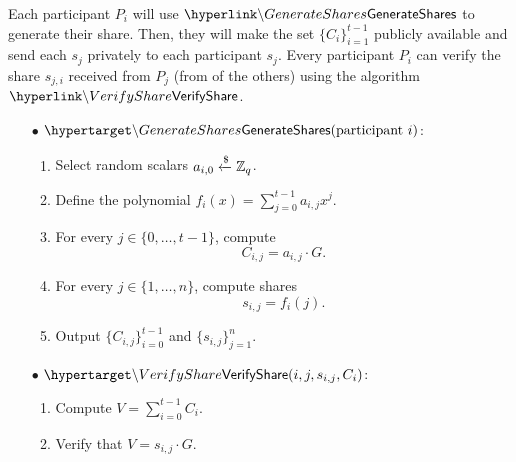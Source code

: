 \begin{mdframed}
Each participant $P_i$ will use $\hlget{\GenerateShares}$ to generate their share. Then, they will make the set $\{C_i\}_{i=1}^{t-1}$ publicly available and send each $s_j$ privately to each participant $s_j$. Every participant $P_i$ can verify the share $s_{j,i}$ received from $P_j$ (from of the others) using the algorithm $\hlget{\VerifyShare}$.\\

\noindent
\begin{minipage}[t]{0.5\textwidth}
	\begin{itemize}
		\item[$\bullet$] $\hlset{\GenerateShares}(\text{participant $i$})$:  \vspace{0.1cm}
		\begin{enumerate}
			\item Select random scalars $a_{i,0} \xleftarrow{\$} \mathbb{Z}_q$.
			\item Define the polynomial $f_i(x) = \sum_{j = 0}^{t-1} a_{i,j} x^{j}$.
			\item For every $j\in\{0,\dots,t-1\}$, compute 
			$$C_{i, j} = a_{i,j}\cdot G.$$
			\item For every $j\in\{1,\dots,n\}$, compute shares 
			$$s_{i, j} = f_i(j).$$
			\item Output $\{C_{i,j}\}_{i=0}^{t-1}$ and $\{s_{i,j}\}_{j=1}^{n}$.  
		\end{enumerate}
	\end{itemize}
\end{minipage}
\begin{minipage}[t]{0.5\textwidth}
	\begin{itemize}
	\item[$\bullet$] $\hlset{\VerifyShare}(i, j, s_{i,j}, C_i)$:  \vspace{0.1cm}
	\begin{enumerate}
		\item Compute $V = \sum_{i = 0}^{t-1} C_i$.
		\item Verify that $V = s_{i,j} \cdot G$.
	\end{enumerate}
	\end{itemize}
\end{minipage}
\end{mdframed}
